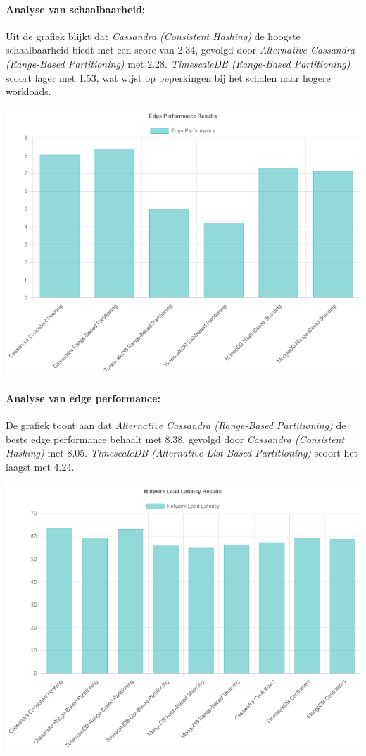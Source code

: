\documentclass[a0,portrait]{hogent-poster}
\begin{document}
\begin{multicols}{2}
\paragraph{Analyse van schaalbaarheid:}
Uit de grafiek blijkt dat \textit{Cassandra (Consistent Hashing)} de hoogste schaalbaarheid biedt met een score van 2.34, gevolgd door \textit{Alternative Cassandra (Range-Based Partitioning)} met 2.28. \textit{TimescaleDB (Range-Based Partitioning)} scoort lager met 1.53, wat wijst op beperkingen bij het schalen naar hogere workloads.

\begin{center}
  \captionsetup{type=figure}
  \includegraphics[width=0.75\linewidth]{Edge_Performance.png}
\end{center}

\paragraph{Analyse van edge performance:}
De grafiek toont aan dat \textit{Alternative Cassandra (Range-Based Partitioning)} de beste edge performance behaalt met 8.38, gevolgd door \textit{Cassandra (Consistent Hashing)} met 8.05. \textit{TimescaleDB (Alternative List-Based Partitioning)} scoort het laagst met 4.24.

\begin{center}
  \captionsetup{type=figure}
  \includegraphics[width=0.75\linewidth]{Network_Load Latency.png}
\end{center}


\end{multicols}
\end{document}
